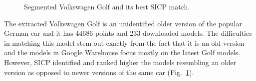 \documentclass{llncs}
\begin{document}
  \begin{figure}
    \centering
    \hspace{3 mm}
    \hspace{3 mm}
    \caption{Segmented Volkswagen Golf and its best SICP match.}
    \label{golf_trio}
  \end{figure}

The extracted Volkswagen Golf is an unidentified older version of the
popular German car and it has 44686 points and 233 downloaded
models. The difficulties in matching this model stem out exactly from
the fact that it is an old version and the models in Google Warehouse
focus mostly on the latest Golf models. However, SICP identified and
ranked higher the models resembling an older version as opposed to
newer versions of the same car (Fig.~\ref{golf_trio}).
 
\end{document}
